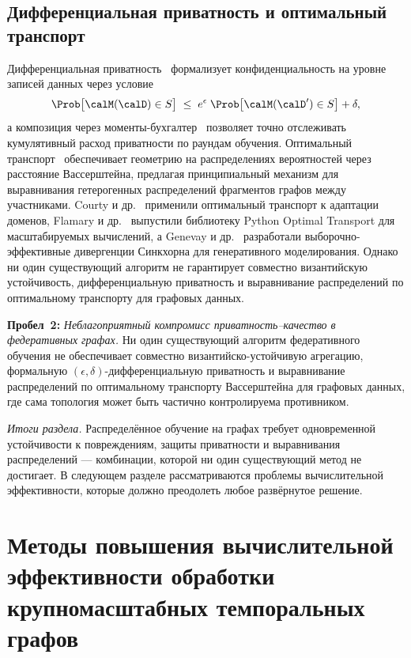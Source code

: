 \subsection{Дифференциальная приватность и оптимальный транспорт}

Дифференциальная приватность~\cite{Dwork2006} формализует конфиденциальность на уровне записей данных через условие
\begin{equation}
\Prob\bigl[\calM(\calD)\in S\bigr]
\;\le\;
e^{\epsilon}\;\Prob\bigl[\calM(\calD')\in S\bigr] + \delta,
\end{equation}
а композиция через моменты-бухгалтер~\cite{Abadi2016} позволяет точно отслеживать кумулятивный расход приватности по раундам обучения. Оптимальный транспорт~\cite{Villani2009,Cuturi2013} обеспечивает геометрию на распределениях вероятностей через расстояние Вассерштейна, предлагая принципиальный механизм для выравнивания гетерогенных распределений фрагментов графов между участниками. Courty и др.~\cite{Courty2017} применили оптимальный транспорт к адаптации доменов, Flamary и др.~\cite{Flamary2021pot} выпустили библиотеку Python Optimal Transport для масштабируемых вычислений, а Genevay и др.~\cite{Genevay2018} разработали выборочно-эффективные дивергенции Синкхорна для генеративного моделирования. Однако ни один существующий алгоритм не гарантирует совместно византийскую устойчивость, дифференциальную приватность и выравнивание распределений по оптимальному транспорту для графовых данных.

\medskip
\noindent\textbf{Пробел~2:} \emph{Неблагоприятный компромисс приватность--качество в федеративных графах.} Ни один существующий алгоритм федеративного обучения не обеспечивает совместно византийско-устойчивую агрегацию, формальную $(\epsilon,\delta)$-дифференциальную приватность и выравнивание распределений по оптимальному транспорту Вассерштейна для графовых данных, где сама топология может быть частично контролируема противником.

\medskip
\noindent\textit{Итоги раздела.} Распределённое обучение на графах требует одновременной устойчивости к повреждениям, защиты приватности и выравнивания распределений --- комбинации, которой ни один существующий метод не достигает. В следующем разделе рассматриваются проблемы вычислительной эффективности, которые должно преодолеть любое развёрнутое решение.


\section{Методы повышения вычислительной эффективности обработки крупномасштабных темпоральных графов}
\label{sec:efficiency}

